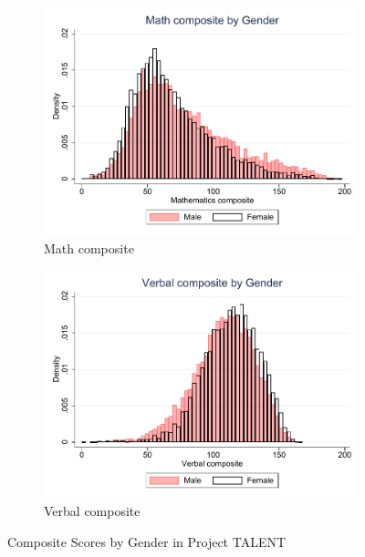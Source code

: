 \documentclass[onehalfspacing,11pt]{article}
\begin{document}
	\begin{figure}
		\begin{subfigure}{0.49\textwidth}
			\includegraphics[width=\linewidth]{TALENT_math_by_gender.pdf}
			\caption{Math composite} \label{fig:nlsy79}
		\end{subfigure}
		\hspace*{\fill} %
		\begin{subfigure}{0.49\textwidth}
			\includegraphics[width=\linewidth]{TALENT_verb_by_gender.pdf}
			\caption{Verbal composite} \label{fig:nlsy97bygender}
		\end{subfigure}
		\caption{Composite Scores by Gender in Project TALENT} \label{fig:talent_gender}
	\end{figure}
	
\end{document}

